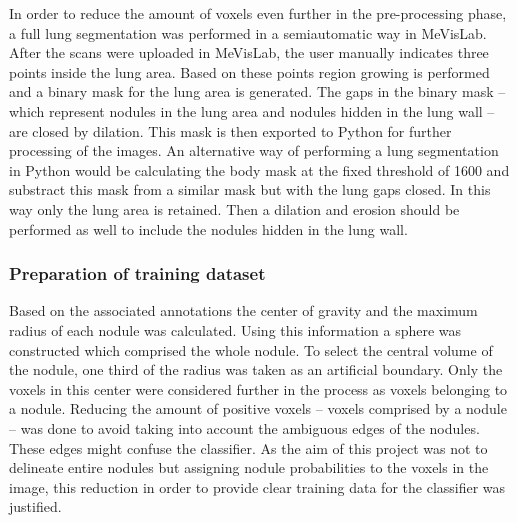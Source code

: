  In order to reduce the amount of voxels even further in the pre-processing
 phase, a full lung segmentation was performed in a semiautomatic way in
 MeVisLab. After the scans were uploaded in MeVisLab, the user manually
 indicates three points inside the lung area. Based on these points region
 growing is performed and a binary mask for the lung area is generated. The gaps
 in the binary mask -- which represent nodules in the lung area and nodules
 hidden in the lung wall -- are closed by dilation.
 This mask is then exported to Python for further processing of the images. An alternative way of performing a lung
 segmentation in Python would be calculating the body mask at the fixed
 threshold of 1600 and substract this mask from a similar mask but with the
 lung gaps closed. In this way only the lung area is retained. Then a dilation
 and erosion should be performed as well to include the nodules hidden in the
 lung wall.


\subsubsection{Preparation of training dataset}
Based on the associated annotations the center of gravity and the maximum radius
of each nodule was calculated. Using this information a sphere was constructed
which comprised the whole nodule. To select the central volume of the nodule,
one third of the radius was taken as an artificial boundary. Only the voxels in
this center were considered further in the process as voxels belonging to a
nodule. Reducing the amount of positive voxels -- voxels comprised by a nodule
-- was done to avoid taking into account the ambiguous edges of the nodules.
These edges might confuse the classifier. As the aim of this project was not to
delineate entire nodules but assigning nodule probabilities to the voxels in
the image, this reduction in order to provide clear training data for the
classifier was justified.

